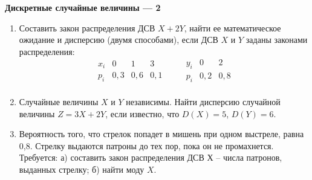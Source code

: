 \documentclass[a4paper,14pt]{extarticle}
\begin{document}
{\centering 
{
\bfseries Дискретные случайные величины --- 2\par}
\begin{enumerate}
\item 
	Составить закон распределения ДСВ  $X+2Y$, найти ее математическое ожидание и дисперсию (двумя способами), если ДСВ $X$ и $Y$ заданы законами распределения:
$$
\begin{array}{c|ccc}
	x_i & 0 & 1 & 3 \\
	\hline
	p_i & 0,3 & 0,6 & 0,1\\
\end{array}
\qquad
\begin{array}{c|cc}
	y_i & 0 & 2 \\
	\hline
	p_i & 0,2 & 0,8\\
\end{array}
$$


\item 
	Случайные величины $X$ и $Y$ независимы. Найти дисперсию случайной величины $Z=3X+2Y$, если известно, что $D(X)=5$, $D(Y)=6$.
\item 
	Вероятность того, что стрелок попадет в мишень при одном выстреле, равна 0,8. Стрелку выдаются патроны до тех пор, пока он не промахнется. Требуется: а) составить закон распределения ДСВ Х – числа патронов, выданных стрелку; б) найти моду $X$.
	

\end{enumerate}}
\end{document}
